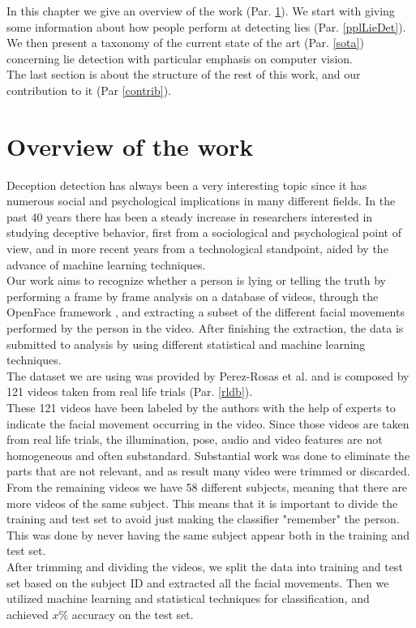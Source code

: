 In this chapter we give an overview of the work (Par. \ref{overview}). We start with giving some information about how people perform at detecting lies (Par. \ref{pplLieDet}). \\
We then present a taxonomy of the current state of the art (Par. \ref{sota}) concerning lie detection with particular emphasis on computer vision. \\
The last section is about the structure of the rest of this work, and our contribution to it (Par \ref{contrib}).

\pagebreak

\section{Overview of the work} \label{overview}
Deception detection has always been a very interesting topic since it has numerous social and psychological implications in many different fields. In the past 40 years there has been a steady increase in researchers interested in studying deceptive behavior, first from a sociological and psychological point of view, and in more recent years from a technological standpoint, aided by the advance of machine learning techniques.\\

Our work aims to recognize whether a person is lying or telling the truth by performing a frame by frame analysis on a database of videos, through the OpenFace framework \cite{Baltru2018}, and extracting a subset of the different facial movements performed by the person in the video. After finishing the extraction, the data is submitted to analysis by using different statistical and machine learning techniques.\\

The dataset we are using was provided by Perez-Rosas et al. \cite{Perez-Rosas:2015:DDU:2818346.2820758} and is composed by 121 videos taken from real life trials (Par. \ref{rldb}).\\
These 121 videos have been labeled by the authors with the help of experts to indicate the facial movement occurring in the video. Since those videos are taken from real life trials, the illumination, pose, audio and video features are not homogeneous and often substandard. Substantial work was done to eliminate the parts that are not relevant, and as result many video were trimmed or discarded.\\

From the remaining videos we have 58 different subjects, meaning that there are more videos of the same subject. This means that it is important to divide the training and test set to avoid just making the classifier "remember" the person. This was done by never having the same subject appear both in the training and test set. \\
After trimming and dividing the videos, we split the data into training and test set based on the subject ID and extracted all the facial movements. Then we utilized machine learning and statistical techniques for classification, and achieved $x \%$ accuracy on the test set.\\

